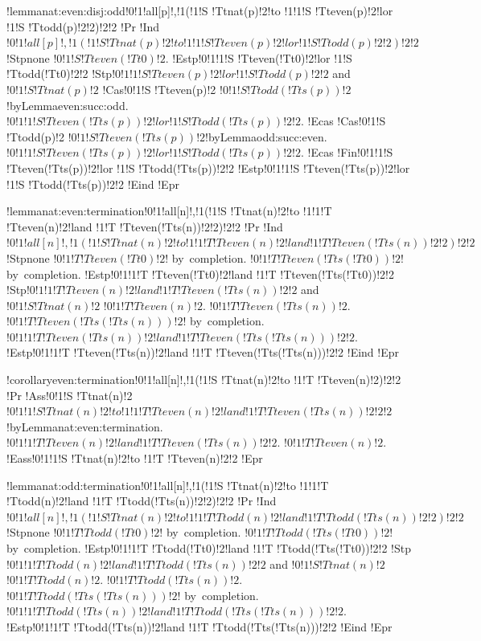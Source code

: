 !lemma{nat:even:disj:odd}{!0!1!all[p]!,!1(!1!S !Tt{nat}(p)!2!to !1!1!S !Tt{even}(p)!2!lor !1!S !Tt{odd}(p)!2!2)!2!2}
!Pr{
!Ind{$!0!1!all[p]!,!1(!1!S !Tt{nat}(p)!2!to !1!1!S !Tt{even}(p)!2!lor !1!S !Tt{odd}(p)!2!2)!2!2$}
!Stp{none}
$!0!1!S !Tt{even}(!Tt{0})!2$.
!Estp{!0!1!1!S !Tt{even}(!Tt{0})!2!lor !1!S !Tt{odd}(!Tt{0})!2!2}
!Stp{$!0!1!1!S !Tt{even}(p)!2!lor !1!S !Tt{odd}(p)!2!2$ and $!0!1!S !Tt{nat}(p)!2$}
!Cas{!0!1!S !Tt{even}(p)!2}
$!0!1!S !Tt{odd}(!Tt{s}(p))!2$!by{Lemma}{even:succ:odd}.
$!0!1!1!S !Tt{even}(!Tt{s}(p))!2!lor !1!S !Tt{odd}(!Tt{s}(p))!2!2$.
!Ecas
!Cas{!0!1!S !Tt{odd}(p)!2}
$!0!1!S !Tt{even}(!Tt{s}(p))!2$!by{Lemma}{odd:succ:even}.
$!0!1!1!S !Tt{even}(!Tt{s}(p))!2!lor !1!S !Tt{odd}(!Tt{s}(p))!2!2$.
!Ecas
!Fin{!0!1!1!S !Tt{even}(!Tt{s}(p))!2!lor !1!S !Tt{odd}(!Tt{s}(p))!2!2}
!Estp{!0!1!1!S !Tt{even}(!Tt{s}(p))!2!lor !1!S !Tt{odd}(!Tt{s}(p))!2!2}
!Eind}
!Epr

!lemma{nat:even:termination}{!0!1!all[n]!,!1(!1!S !Tt{nat}(n)!2!to !1!1!T !Tt{even}(n)!2!land !1!T !Tt{even}(!Tt{s}(n))!2!2)!2!2}
!Pr{
!Ind{$!0!1!all[n]!,!1(!1!S !Tt{nat}(n)!2!to !1!1!T !Tt{even}(n)!2!land !1!T !Tt{even}(!Tt{s}(n))!2!2)!2!2$}
!Stp{none}
$!0!1!T !Tt{even}(!Tt{0})!2$! by~completion.
$!0!1!T !Tt{even}(!Tt{s}(!Tt{0}))!2$! by~completion.
!Estp{!0!1!1!T !Tt{even}(!Tt{0})!2!land !1!T !Tt{even}(!Tt{s}(!Tt{0}))!2!2}
!Stp{$!0!1!1!T !Tt{even}(n)!2!land !1!T !Tt{even}(!Tt{s}(n))!2!2$ and $!0!1!S !Tt{nat}(n)!2$}
$!0!1!T !Tt{even}(n)!2$.
$!0!1!T !Tt{even}(!Tt{s}(n))!2$.
$!0!1!T !Tt{even}(!Tt{s}(!Tt{s}(n)))!2$! by~completion.
$!0!1!1!T !Tt{even}(!Tt{s}(n))!2!land !1!T !Tt{even}(!Tt{s}(!Tt{s}(n)))!2!2$.
!Estp{!0!1!1!T !Tt{even}(!Tt{s}(n))!2!land !1!T !Tt{even}(!Tt{s}(!Tt{s}(n)))!2!2}
!Eind}
!Epr

!corollary{even:termination}{!0!1!all[n]!,!1(!1!S !Tt{nat}(n)!2!to !1!T !Tt{even}(n)!2)!2!2}
!Pr{
!Ass{!0!1!S !Tt{nat}(n)!2}
$!0!1!1!S !Tt{nat}(n)!2!to !1!1!T !Tt{even}(n)!2!land !1!T !Tt{even}(!Tt{s}(n))!2!2!2$!by{Lemma}{nat:even:termination}.
$!0!1!1!T !Tt{even}(n)!2!land !1!T !Tt{even}(!Tt{s}(n))!2!2$.
$!0!1!T !Tt{even}(n)!2$.
!Eass{!0!1!1!S !Tt{nat}(n)!2!to !1!T !Tt{even}(n)!2!2}}
!Epr

!lemma{nat:odd:termination}{!0!1!all[n]!,!1(!1!S !Tt{nat}(n)!2!to !1!1!T !Tt{odd}(n)!2!land !1!T !Tt{odd}(!Tt{s}(n))!2!2)!2!2}
!Pr{
!Ind{$!0!1!all[n]!,!1(!1!S !Tt{nat}(n)!2!to !1!1!T !Tt{odd}(n)!2!land !1!T !Tt{odd}(!Tt{s}(n))!2!2)!2!2$}
!Stp{none}
$!0!1!T !Tt{odd}(!Tt{0})!2$! by~completion.
$!0!1!T !Tt{odd}(!Tt{s}(!Tt{0}))!2$! by~completion.
!Estp{!0!1!1!T !Tt{odd}(!Tt{0})!2!land !1!T !Tt{odd}(!Tt{s}(!Tt{0}))!2!2}
!Stp{$!0!1!1!T !Tt{odd}(n)!2!land !1!T !Tt{odd}(!Tt{s}(n))!2!2$ and $!0!1!S !Tt{nat}(n)!2$}
$!0!1!T !Tt{odd}(n)!2$.
$!0!1!T !Tt{odd}(!Tt{s}(n))!2$.
$!0!1!T !Tt{odd}(!Tt{s}(!Tt{s}(n)))!2$! by~completion.
$!0!1!1!T !Tt{odd}(!Tt{s}(n))!2!land !1!T !Tt{odd}(!Tt{s}(!Tt{s}(n)))!2!2$.
!Estp{!0!1!1!T !Tt{odd}(!Tt{s}(n))!2!land !1!T !Tt{odd}(!Tt{s}(!Tt{s}(n)))!2!2}
!Eind}
!Epr

